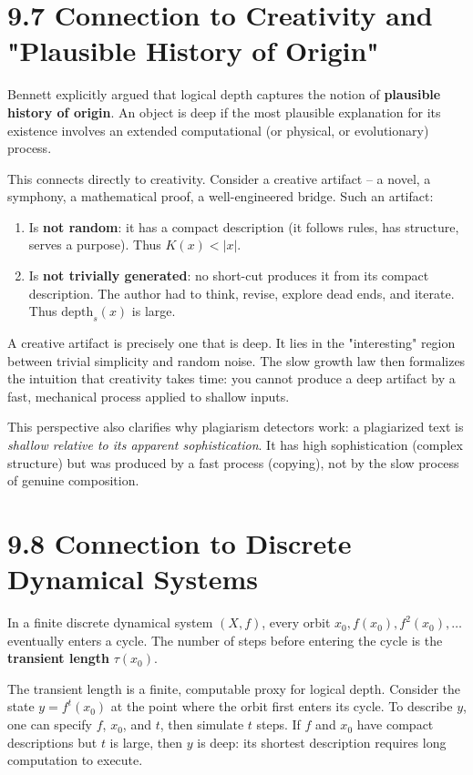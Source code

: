\section{9.7 Connection to Creativity and "Plausible History of Origin"}

Bennett explicitly argued that logical depth captures the notion of \textbf{plausible history of origin}. An object is deep if the most plausible explanation for its existence involves an extended computational (or physical, or evolutionary) process.

This connects directly to creativity. Consider a creative artifact -- a novel, a symphony, a mathematical proof, a well-engineered bridge. Such an artifact:

\begin{enumerate}
  \item Is \textbf{not random}: it has a compact description (it follows rules, has structure, serves a purpose). Thus $K(x) < |x|$.
  \item Is \textbf{not trivially generated}: no short-cut produces it from its compact description. The author had to think, revise, explore dead ends, and iterate. Thus $\text{depth}_s(x)$ is large.
\end{enumerate}

A creative artifact is precisely one that is deep. It lies in the "interesting" region between trivial simplicity and random noise. The slow growth law then formalizes the intuition that creativity takes time: you cannot produce a deep artifact by a fast, mechanical process applied to shallow inputs.

This perspective also clarifies why plagiarism detectors work: a plagiarized text is \textit{shallow relative to its apparent sophistication}. It has high sophistication (complex structure) but was produced by a fast process (copying), not by the slow process of genuine composition.

\section{9.8 Connection to Discrete Dynamical Systems}

In a finite discrete dynamical system $(X, f)$, every orbit $x_0, f(x_0), f^2(x_0), \ldots$ eventually enters a cycle. The number of steps before entering the cycle is the \textbf{transient length} $\tau(x_0)$.

The transient length is a finite, computable proxy for logical depth. Consider the state $y = f^t(x_0)$ at the point where the orbit first enters its cycle. To describe $y$, one can specify $f$, $x_0$, and $t$, then simulate $t$ steps. If $f$ and $x_0$ have compact descriptions but $t$ is large, then $y$ is deep: its shortest description requires long computation to execute.


